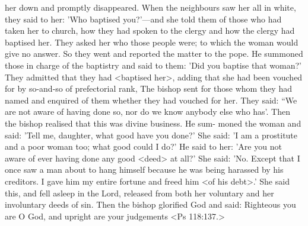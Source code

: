 her down and promptly disappeared. When the neighbours saw her
all in white, they said to her: 'Who baptised you?'—and she told
them of those who had taken her to church, how they had spoken
to the clergy and how the clergy had baptised her. They asked her
who those people were; to which the woman would give no answer.
So they went and reported the matter to the pope. He summoned
those in charge of the baptistry and said to them: 'Did you baptise
that woman?' They admitted that they had <baptised her>, adding
that she had been vouched for by so-and-so of prefectorial rank,
The bishop sent for those whom they had named and enquired of
them whether they had vouched for her. They said: “We are not
aware of having done so, nor do we know anybody else who has'.
Then the bishop realised that this was divine business. He sum-
moned the woman and said: 'Tell me, daughter, what good have
you done?' She said: 'I am a prostitute and a poor woman too; what
good could I do?' He said to her: 'Are you not aware of ever having
done any good <deed> at all?' She said: 'No. Except that I once
saw a man about to hang himself because he was being harassed by
his creditors. I gave him my entire fortune and freed him <of his
debt>.' She said this, and fell asleep in the Lord, released from both
her voluntary and her involuntary deeds of sin. Then the bishop
glorified God and said: Righteous you are O God, and upright are
your judgements <Ps 118:137.>

